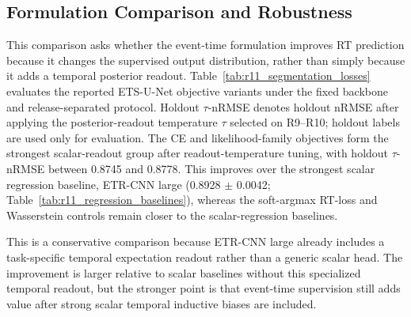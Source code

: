 \documentclass[12pt]{article}
\begin{document}
\subsection{Formulation Comparison and Robustness}

This comparison asks whether the event-time formulation improves RT prediction because it changes the supervised output distribution, rather than simply because it adds a temporal posterior readout. Table~\ref{tab:r11_segmentation_losses} evaluates the reported ETS-U-Net objective variants under the fixed backbone and release-separated protocol. Holdout \(\tau\)-nRMSE denotes holdout nRMSE after applying the posterior-readout temperature \(\tau\) selected on R9--R10; holdout labels are used only for evaluation. The CE and likelihood-family objectives form the strongest scalar-readout group after readout-temperature tuning, with holdout \(\tau\)-nRMSE between 0.8745 and 0.8778. This improves over the strongest scalar regression baseline, ETR-CNN large (0.8928 $\pm$ 0.0042; Table~\ref{tab:r11_regression_baselines}), whereas the soft-argmax RT-loss and Wasserstein controls remain closer to the scalar-regression baselines.

This is a conservative comparison because ETR-CNN large already includes a task-specific temporal expectation readout rather than a generic scalar head. The improvement is larger relative to scalar baselines without this specialized temporal readout, but the stronger point is that event-time supervision still adds value after strong scalar temporal inductive biases are included.
\end{document}
